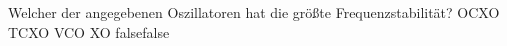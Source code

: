     {Welcher der angegebenen Oszillatoren hat die größte Frequenzstabilität?}
    {OCXO}
    {TCXO}
    {VCO}
    {XO}
    {false}{false}